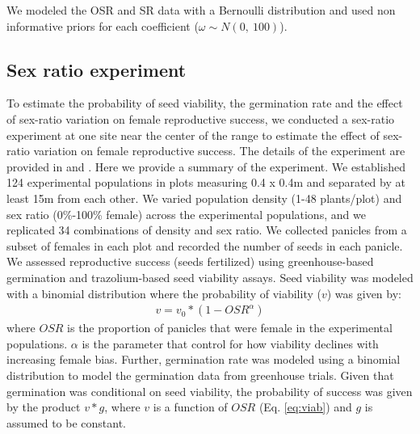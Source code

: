 \documentclass[12pt]{article}\usepackage[]{graphicx}\usepackage[dvipsnames]{xcolor}
\begin{document}
We modeled the OSR and SR data with a Bernoulli distribution and used non informative priors for each coefficient ($\omega \sim N(0,\ 100)$). 
\subsection{Sex ratio experiment} \label {sssec:experiment}
To estimate the probability of seed viability,  the germination rate and the effect of sex-ratio variation on female reproductive success, we conducted a sex-ratio experiment at one site near the center of the range to estimate the effect of sex-ratio variation on female reproductive success.
The details of the experiment are provided in \cite{compagnoni2017can} and \cite{miller2022two}.
Here we provide a summary of the experiment.
We established 124 experimental populations in plots measuring 0.4 x 0.4m and separated by at least 15m from each other.
We varied population density (1-48 plants/plot) and sex ratio (0\%-100\% female) across the experimental populations, and we replicated 34 combinations of density and sex ratio.
We collected panicles from a subset of females in each plot and recorded the number of seeds in each panicle.
We assessed reproductive success (seeds fertilized) using greenhouse-based germination and trazolium-based seed viability assays.
Seed viability was modeled with a binomial distribution where the probability of viability ($v$) was given by:
\begin{align}\label{eq:viab}
	v = v_{0} * (1 - OSR^{\alpha})
\end{align}
\noindent where $OSR$ is the proportion of panicles that were female in the experimental populations.
$\alpha$ is the parameter that control for how viability declines with increasing female bias.
Further, germination rate was modeled using a binomial distribution to model the germination data from greenhouse trials.
Given that germination was conditional on seed viability, the probability of success was given by the product $v*g$, where $v$ is a function of $OSR$ (Eq. \ref{eq:viab}) and $g$ is assumed to be constant.
\end{document}
